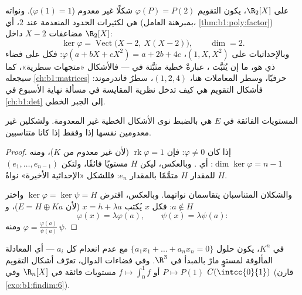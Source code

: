 \begin{example}
\label{ex:b1:linmaps:evaluationform}
على $\R_2[X]$، يكون التقويم $\varphi(P) = P(2)$ شكلًا
 غير معدوم ($\varphi(1) = 1$). ونواته هي 
لكثيرات الحدود المنعدمة عند $2$، أي (بمبرهنة العامل،
\cref{thm:b1:poly:factor}) مضاعفات $X - 2$ داخل
$\R_2[X]$:
\[
\ker\varphi = \operatorname{Vect}\bigl(X - 2,\ X(X - 2)\bigr),
\qquad \dim = 2 .
\]
وبالإحداثيات على $(1, X, X^2)$، $\varphi(a + bX + cX^2) = a +
2b + 4c$: فكل  على فضاء ذي  هو،
ما إن يُثبَّت ، عبارةٌ خطية مثبَّتة في
 --- فالأشكال «متجهات سطرية»، كما
سيجعله \cref{ch:b1:matrices} حرفيًا، وسطر المعاملات
هنا، $(1, 2, 4)$، سطرُ فاندرموند: فأشكال التقويم
هي كيف تدخل نظرية المقايسة في مسألة نهاية الأسبوع في \cref{ch:b1:det}
إلى الجبر الخطي.
\end{example}

\begin{theorem}\label{thm:b1:linmaps:hyperplanes}
المستويات الفائقة في $E$ هي بالضبط نوى الأشكال الخطية
غير المعدومة. ولشكلين غير معدومين  نفسها إذا وفقط إذا كانا
متناسبين.
\end{theorem}

\begin{proof}
إذا كان $\varphi \neq 0$: فإن $\operatorname{rk}\varphi = 1$ (لأن   غير معدوم من $K$)، ومنه $\dim\ker\varphi = n - 1$: أي .
وبالعكس، ليكن $H$ مستويًا فائقًا، ولتكن $(e_1, \dots, e_{n-1})$ 
للمقدار $H$ متمَّمًا بالمقدار $e_n$: فللشكل «الإحداثية الأخيرة» نواةٌ
$H$.

والشكلان المتناسبان يتقاسمان نواتهما. وبالعكس، افترض
$\ker\varphi = \ker\psi = H$ واختر $a \notin H$: فكل $x$ يُكتب
$x = h + \lambda a$ (لأن $E = H \oplus Ka$)، و
\[
\varphi(x) = \lambda \varphi(a), \qquad \psi(x) = \lambda\psi(a):
\]
ومنه $\varphi = \frac{\varphi(a)}{\psi(a)}\,\psi$.
\end{proof}

\begin{example}\label{ex:b1:linmaps:hyperplane}
في $K^n$، يكون   حلول $\{a_1 x_1 + \dots + a_n
x_n = 0\}$ مع عدم انعدام كل $a_i$ --- أي المعادلة المألوفة
لمستوٍ مارّ بالمبدأ في $\R^3$. وفي فضاءات الدوال، تعرّف أشكال
التقويم $P \mapsto P(1)$ أو $f \mapsto \int_0^1 f$ مستويات فائقة
في $\R_n[X]$ وفي $C(\intcc{0}{1})$ (قارن \cref{exo:b1:findim:6}).
\end{example}


